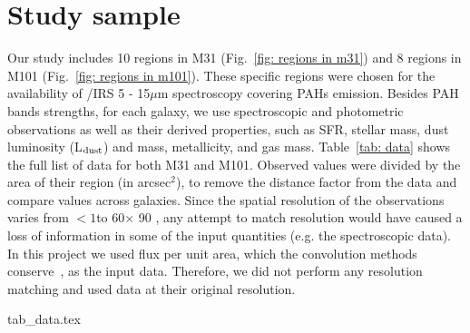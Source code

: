 
\section{Study sample}
\label{Sec: data_SOMN}

Our study includes 10 regions in M31 (Fig.~\ref{fig: regions in m31}) and 8 regions in M101 (Fig.~\ref{fig: regions in m101}). 
These specific regions were chosen for the availability of \Spitzer/IRS 5 - 15$\mu$m  spectroscopy covering PAHs emission.
Besides PAH bands strengths, for each galaxy, we use spectroscopic and photometric observations as well as their derived properties, such as SFR, stellar mass, dust luminosity (L$_{\rm dust}$) and mass, metallicity, and gas mass.
Table~\ref{tab: data} shows the full list of data for both M31 and M101.
Observed values were divided by the area of their region (in arcsec$^2$), to remove the distance factor from the data and compare values across galaxies.
Since the spatial resolution of the observations varies from $<1$\arcsec to 60\arcsec $\times$ 90 \arcsec, any attempt to match resolution would have caused a loss of information in some of the input quantities (e.g. the spectroscopic data).
In this project we used flux per unit area, which the convolution methods conserve~\citep{Aniano12}, as the input data.
Therefore, we did not perform any resolution matching and used data at their original resolution. %


{tab_data.tex}

